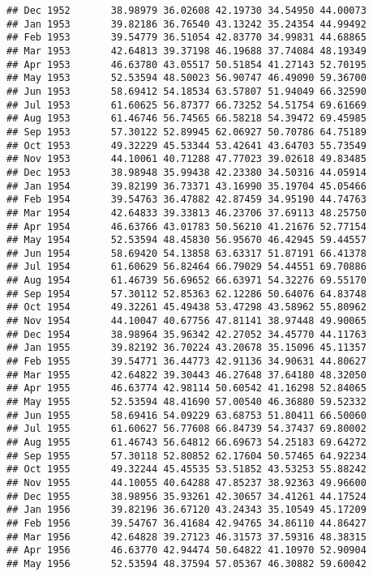 \documentclass[
]{article}
\begin{document}
\begin{verbatim}
## Dec 1952       38.98979 36.02608 42.19730 34.54950 44.00073
## Jan 1953       39.82186 36.76540 43.13242 35.24354 44.99492
## Feb 1953       39.54779 36.51054 42.83770 34.99831 44.68865
## Mar 1953       42.64813 39.37198 46.19688 37.74084 48.19349
## Apr 1953       46.63780 43.05517 50.51854 41.27143 52.70195
## May 1953       52.53594 48.50023 56.90747 46.49090 59.36700
## Jun 1953       58.69412 54.18534 63.57807 51.94049 66.32590
## Jul 1953       61.60625 56.87377 66.73252 54.51754 69.61669
## Aug 1953       61.46746 56.74565 66.58218 54.39472 69.45985
## Sep 1953       57.30122 52.89945 62.06927 50.70786 64.75189
## Oct 1953       49.32229 45.53344 53.42641 43.64703 55.73549
## Nov 1953       44.10061 40.71288 47.77023 39.02618 49.83485
## Dec 1953       38.98948 35.99438 42.23380 34.50316 44.05914
## Jan 1954       39.82199 36.73371 43.16990 35.19704 45.05466
## Feb 1954       39.54763 36.47882 42.87459 34.95190 44.74763
## Mar 1954       42.64833 39.33813 46.23706 37.69113 48.25750
## Apr 1954       46.63766 43.01783 50.56210 41.21676 52.77154
## May 1954       52.53594 48.45830 56.95670 46.42945 59.44557
## Jun 1954       58.69420 54.13858 63.63317 51.87191 66.41378
## Jul 1954       61.60629 56.82464 66.79029 54.44551 69.70886
## Aug 1954       61.46739 56.69652 66.63971 54.32276 69.55170
## Sep 1954       57.30112 52.85363 62.12286 50.64076 64.83748
## Oct 1954       49.32261 45.49438 53.47298 43.58962 55.80962
## Nov 1954       44.10047 40.67756 47.81141 38.97448 49.90065
## Dec 1954       38.98964 35.96342 42.27052 34.45770 44.11763
## Jan 1955       39.82192 36.70224 43.20678 35.15096 45.11357
## Feb 1955       39.54771 36.44773 42.91136 34.90631 44.80627
## Mar 1955       42.64822 39.30443 46.27648 37.64180 48.32050
## Apr 1955       46.63774 42.98114 50.60542 41.16298 52.84065
## May 1955       52.53594 48.41690 57.00540 46.36880 59.52332
## Jun 1955       58.69416 54.09229 63.68753 51.80411 66.50060
## Jul 1955       61.60627 56.77608 66.84739 54.37437 69.80002
## Aug 1955       61.46743 56.64812 66.69673 54.25183 69.64272
## Sep 1955       57.30118 52.80852 62.17604 50.57465 64.92234
## Oct 1955       49.32244 45.45535 53.51852 43.53253 55.88242
## Nov 1955       44.10055 40.64288 47.85237 38.92363 49.96600
## Dec 1955       38.98956 35.93261 42.30657 34.41261 44.17524
## Jan 1956       39.82196 36.67120 43.24343 35.10549 45.17209
## Feb 1956       39.54767 36.41684 42.94765 34.86110 44.86427
## Mar 1956       42.64828 39.27123 46.31573 37.59316 48.38315
## Apr 1956       46.63770 42.94474 50.64822 41.10970 52.90904
## May 1956       52.53594 48.37594 57.05367 46.30882 59.60042

\end{verbatim}
\end{document}
